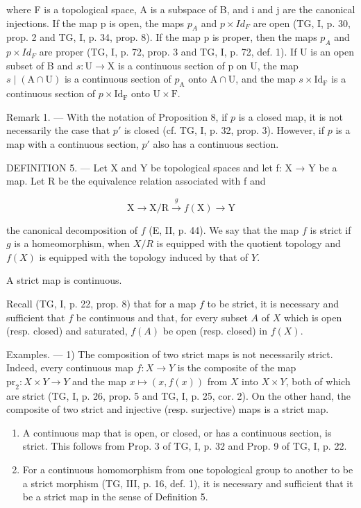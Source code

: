 where F is a topological space, A is a subspace of B, and i and j are the canonical injections. If the map p is open, the maps \(p_{A}\) and \(p \times Id_{F}\) are open (TG, I, p. 30, prop. 2 and TG, I, p. 34, prop. 8). If the map p is proper, then the maps \(p_{A}\) and \(p \times Id_{F}\) are proper (TG, I, p. 72, prop. 3 and TG, I, p. 72, def. 1). If U is an open subset of B and \(s\colon\mathrm{U}\to\mathrm{X}\) is a continuous section of p on U, the map \(s\mid(\mathrm{A}\cap\mathrm{U})\) is a continuous section of \(p_{\mathrm{A}}\) onto \(\mathrm{A}\cap\mathrm{U}\), and the map \(s\times\mathrm{Id}_{\mathrm{F}}\) is a continuous section of \(p\times\mathrm{Id}_{\mathrm{F}}\) onto \(\mathrm{U}\times\mathrm{F}\).

Remark 1. --- With the notation of Proposition 8, if \(p\) is a closed map, it is not necessarily the case that \(p'\) is closed (cf. TG, I, p. 32, prop. 3). However, if \(p\) is a map with a continuous section, \(p'\) also has a continuous section.

DEFINITION 5. --- Let X and Y be topological spaces and let f: X → Y be a map. Let R be the equivalence relation associated with f and

\[
\mathrm{X} \rightarrow \mathrm{X} / \mathrm{R} \xrightarrow {g} f (\mathrm{X}) \rightarrow \mathrm{Y}
\]

the canonical decomposition of \(f\) (E, II, p. 44). We say that the map \(f\) is strict if \(g\) is a homeomorphism, when \(X/R\) is equipped with the quotient topology and \(f(X)\) is equipped with the topology induced by that of \(Y\).

A strict map is continuous.

Recall (TG, I, p. 22, prop. 8) that for a map \(f\) to be strict, it is necessary and sufficient that \(f\) be continuous and that, for every subset \(A\) of \(X\) which is open (resp. closed) and saturated, \(f(A)\) be open (resp. closed) in \(f(X)\).

Examples. --- 1) The composition of two strict maps is not necessarily strict. Indeed, every continuous map \(f \colon X \to Y\) is the composite of the map \(\mathrm{pr}_2 \colon X \times Y \to Y\) and the map \(x \mapsto (x, f(x))\) from \(X\) into \(X \times Y\), both of which are strict (TG, I, p. 26, prop. 5 and TG, I, p. 25, cor. 2). On the other hand, the composite of two strict and injective (resp. surjective) maps is a strict map.

\begin{enumerate}
\def\labelenumi{\arabic{enumi})}
\setcounter{enumi}{1}
\item
  A continuous map that is open, or closed, or has a continuous section, is strict. This follows from Prop. 3 of TG, I, p. 32 and Prop. 9 of TG, I, p. 22.
\item
  For a continuous homomorphism from one topological group to another to be a strict morphism (TG, III, p. 16, def. 1), it is necessary and sufficient that it be a strict map in the sense of Definition 5.
\end{enumerate}


